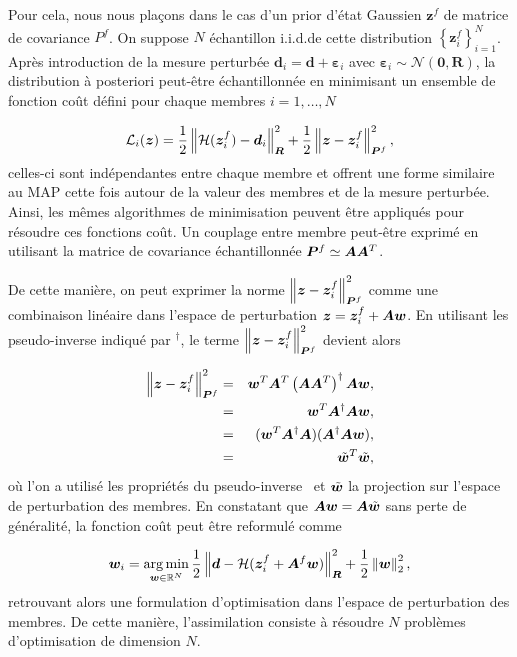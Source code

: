 Pour cela, nous nous plaçons dans le cas d'un prior d'état Gaussien $\bm z^f$ de matrice de covariance $P^f$. On suppose $N$ échantillon i.i.d.de cette distribution $\left\{\bm z^f_i\right\}_{i=1}^N$. Après introduction de la mesure perturbée $\bm d_i = \bm d + \bm \varepsilon_i$ avec $\bm \varepsilon_i \sim \mathcal{N}(\bm 0, \bm R)$, la distribution à posteriori peut-être échantillonnée en minimisant un ensemble de fonction coût défini pour chaque membres $i = 1, \dots, N$

\begin{equation*}
    \mathcal L_i(\bm z) = \frac12 \left\lVert \mathcal H (\bm z^f_i) - \bm d_i \right\rVert_{\bm R}^2 + \frac12 \left\lVert \bm z -\bm z^f_i \right\rVert^2_{\bm P^f},
\end{equation*}celles-ci sont indépendantes entre chaque membre et offrent une forme similaire au MAP cette fois autour de la valeur des membres et de la mesure perturbée. Ainsi, les mêmes algorithmes de minimisation peuvent être appliqués pour résoudre ces fonctions coût. Un couplage entre membre peut-être exprimé en utilisant la matrice de covariance échantillonnée $\bm P^f\simeq \bm A \bm A^T$.

De cette manière, on peut exprimer la norme $\left\lVert \bm z -\bm z^f_i \right\rVert^2_{\bm P^f}$ comme une combinaison linéaire dans l'espace de perturbation $\bm z = \bm z^f_i + \bm A \bm w$. En utilisant les pseudo-inverse indiqué par $^\dagger$, le terme $\left\lVert \bm z -\bm z^f_i \right\rVert^2_{\bm P^f}$ devient alors

\begin{eqnarray*}
    \left\lVert \bm z -\bm z^f_i \right\rVert^2_{\bm P^f} &=&  \bm w^T \bm A^T\left(\bm A \bm A^T\right)^\dagger \bm A \bm w,\\
    &=&\bm w^T \bm A^\dagger  \bm A \bm w,\\
    &=&(\bm w^T \bm A^\dagger  \bm A) (\bm A^\dagger  \bm A \bm w), \\
    &=& \tilde{\bm w}^T \tilde{\bm w},
\end{eqnarray*}où l'on a utilisé les propriétés du pseudo-inverse~\cite{ben-israel2003generalized} et $\tilde{\bm w}$ la projection sur l'espace de perturbation des membres. En constatant que $\bm A \bm w =\bm A \tilde{\bm w}$ sans perte de généralité, la fonction coût peut être reformulé comme

\begin{equation*}
    \bm w_i = \operatorname*{arg\,min}_{\bm w \in \mathbb R^N} \frac12 \left\lVert \bm d - \mathcal H(\bm{z}_i^f + \bm A^f \bm w) \right\rVert^2_{\bm R} + \frac12 \left\lVert \bm w \right\rVert_2^2,
\end{equation*}retrouvant alors une formulation d'optimisation dans l'espace de perturbation des membres. De cette manière, l'assimilation consiste à résoudre $N$ problèmes d'optimisation de dimension $N$.

